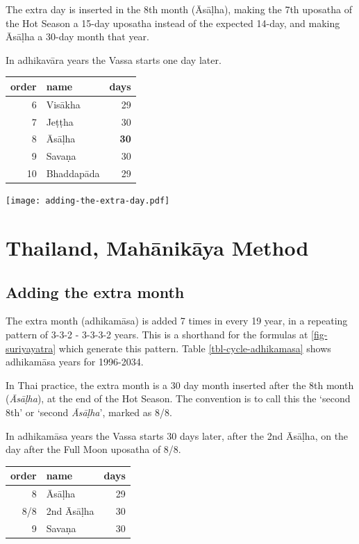 \documentclass[11pt,oneside]{memoir-article}
\begin{document}
The extra day is inserted in the 8th month (Āsāḷha), making the 7th uposatha of
the Hot Season a 15-day uposatha instead of the expected 14-day, and making
Āsāḷha a 30-day month that year.\cite{hasapannyo-zodiac}

In adhikavāra years the Vassa starts one day later.

\begin{center}
\begin{tabular}{rlr}
order & name & days\\
\hline
6 & Visākha & 29\\
7 & Jeṭṭha & 30\\
8 & Āsāḷha & \textbf{30}\\
9 & Savaṇa & 30\\
10 & Bhaddapāda & 29\\
\end{tabular}
\end{center}

\texttt{[image: adding-the-extra-day.pdf]}

\clearpage

\chapter{Thailand, Mahānikāya Method}
\label{sec-2}
\section{Adding the extra month}
\label{sec-2-1}

The extra month (adhikamāsa) is added 7 times in every 19 year, in a repeating
pattern of 3-3-2 - 3-3-3-2 years. This is a shorthand for the formulas
at \ref{fig-suriyayatra} which generate this pattern. Table
\ref{tbl-cycle-adhikamasa} shows adhikamāsa years for 1996-2034.

In Thai practice, the extra month is a 30 day month inserted after the
8th month (\emph{Āsāḷha}), at the end of the Hot Season. The convention is
to call this the `second 8th' or `second \emph{Āsāḷha}', marked as 8/8.

In adhikamāsa years the Vassa starts 30 days later, after the 2nd
Āsāḷha, on the day after the Full Moon uposatha of 8/8.

\begin{center}
\begin{tabular}{rlr}
order & name & days\\
\hline
8 & Āsāḷha & 29\\
8/8 & 2nd Āsāḷha & 30\\
9 & Savaṇa & 30\\
\end{tabular}
\end{center}
\end{document}
